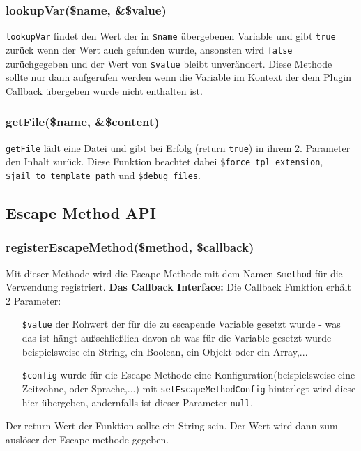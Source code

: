 \documentclass[a4paper,10pt]{article}
\begin{document}
\subsubsection{lookupVar(\$name, \&\$value)}
{\tt lookupVar} findet den Wert der in {\tt \$name} \"ubergebenen Variable und gibt {\tt true} zur\"uck wenn der Wert
auch gefunden wurde, ansonsten wird {\tt false} zur\"uchgegeben und der Wert von {\tt \$value} bleibt unver\"andert.
Diese Methode sollte nur dann aufgerufen werden wenn die Variable im Kontext der dem Plugin Callback \"ubergeben wurde nicht enthalten ist.

\subsubsection{getFile(\$name, \&\$content)}
{\tt getFile} l\"adt eine Datei und gibt bei Erfolg (return {\tt true}) in ihrem 2. Parameter den Inhalt zur\"uck. Diese Funktion beachtet
dabei {\tt \$force\_tpl\_extension}, {\tt \$jail\_to\_template\_path} und {\tt \$debug\_files}.

\subsection{Escape Method API}

\subsubsection{registerEscapeMethod(\$method, \$callback)}
Mit dieser Methode wird die Escape Methode mit dem Namen {\tt \$method} f\"ur die Verwendung registriert.\newline
\newline
{\bf Das Callback Interface:}\newline
Die Callback Funktion erh\"alt 2 Parameter:
\begin{itemize}
  \item[{\tt \$value}] der Rohwert der f\"ur die zu escapende Variable gesetzt wurde - was das ist h\"angt au\ss{}schlie\ss{}lich davon ab was f\"ur die Variable gesetzt wurde - beispielsweise ein String, ein Boolean, ein Objekt oder ein Array,...
  \item[{\tt \$config}] wurde f\"ur die Escape Methode eine Konfiguration(beispielsweise eine Zeitzohne, oder Sprache,...) mit {\tt setEscapeMethodConfig} hinterlegt wird diese hier \"ubergeben, andernfalls ist dieser Parameter {\tt null}.
\end{itemize}
Der return Wert der Funktion sollte ein String sein. Der Wert wird dann zum ausl\"oser der Escape methode gegeben.
\end{document}
